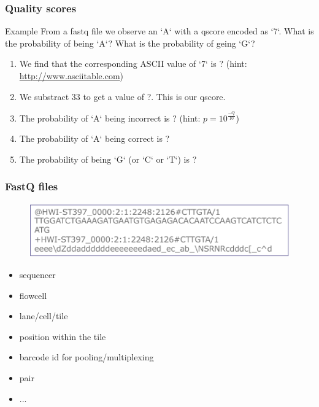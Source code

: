\begin{frame}
\frametitle{Quality scores}

	\begin{block}{Example}
		From a fastq file we observe an `A` with a qscore encoded as `7`.
		What is the probability of being `A`? What is the probability of geing `G`? 
	\end{block}

	\begin{enumerate}
		\item We find that the corresponding ASCII value of `7` is ? (hint: \url{http://www.asciitable.com})
		\pause
		\item We substract 33 to get a value of ?. This is our qscore.
		\item The probability of `A` being incorrect is ? (hint: $p=10^\frac{-Q}{10}$)
		\item The probability of `A` being correct is ?
		\item The probability of being `G` (or `C` or `T`) is ?
	\end{enumerate}

\end{frame}


\begin{frame}
\frametitle{FastQ files}

        \begin{figure}
                \includegraphics[width=\textwidth]{Pics/fastq_more.png}
        \end{figure}

	\begin{itemize}
		\item sequencer
		\item flowcell
		\item lane/cell/tile
		\item position within the tile
		\item barcode id for pooling/multiplexing
		\item pair
		\item ...
	\end{itemize}

\end{frame}

